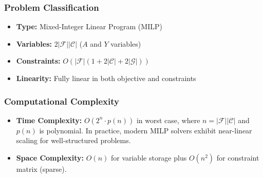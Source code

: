 \documentclass{article}
\begin{document}
\subsubsection{Problem Classification}
\begin{itemize}
    \item \textbf{Type:} Mixed-Integer Linear Program (MILP)
    \item \textbf{Variables:} $2|\mathcal{F}||\mathcal{C}|$ ($A$ and $Y$ variables)
    \item \textbf{Constraints:} $O(|\mathcal{F}|(1 + 2|\mathcal{C}| + 2|\mathcal{G}|))$
    \item \textbf{Linearity:} Fully linear in both objective and constraints
\end{itemize}




\subsubsection{Computational Complexity}
\begin{itemize}
    \item \textbf{Time Complexity:} $O(2^n \cdot p(n))$ in worst case, where $n = |\mathcal{F}||\mathcal{C}|$ and $p(n)$ is polynomial. In practice, modern MILP solvers exhibit near-linear scaling for well-structured problems.
    \item \textbf{Space Complexity:} $O(n)$ for variable storage plus $O(n^2)$ for constraint matrix (sparse).
\end{itemize}
\end{document}

